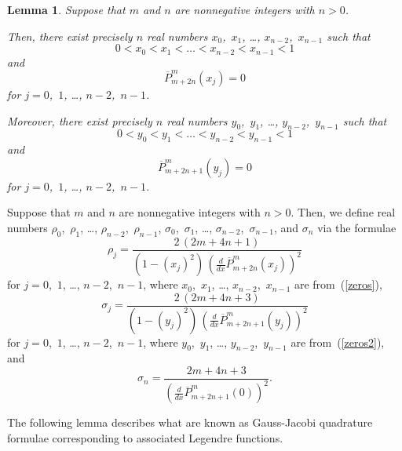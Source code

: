 \documentclass[final,3p,times]{elsarticle}
\newtheorem{lemma1}[theorem]{Lemma}
\newenvironment{lemma}{\begin{lemma1}}{\end{lemma1}}
\begin{document}
\begin{lemma}
\label{distinct_theorem}
Suppose that $m$ and $n$ are nonnegative integers with $n > 0$.

Then, there exist precisely $n$ real numbers
$x_0$,~$x_1$, \dots, $x_{n-2}$,~$x_{n-1}$ such that
\begin{equation}
\label{distinctness}
0 < x_0 < x_1 < \ldots < x_{n-2} < x_{n-1} < 1
\end{equation}
and
\begin{equation}
\label{zeros}
\overline{P}^m_{m+2n}(x_j) = 0
\end{equation}
for $j = 0$,~$1$, \dots, $n-2$,~$n-1$.

Moreover, there exist precisely $n$ real numbers
$y_0$,~$y_1$, \dots, $y_{n-2}$,~$y_{n-1}$ such that
\begin{equation}
\label{distinctness2}
0 < y_0 < y_1 < \ldots < y_{n-2} < y_{n-1} < 1
\end{equation}
and
\begin{equation}
\label{zeros2}
\overline{P}^m_{m+2n+1}(y_j) = 0
\end{equation}
for $j = 0$,~$1$, \dots, $n-2$,~$n-1$.
\end{lemma}


Suppose that $m$ and $n$ are nonnegative integers with $n > 0$.
Then, we define real numbers
$\rho_0$,~$\rho_1$, \dots, $\rho_{n-2}$,~$\rho_{n-1}$,
$\sigma_0$,~$\sigma_1$, \dots, $\sigma_{n-2}$,~$\sigma_{n-1}$,
and $\sigma_n$ via the formulae
\begin{equation}
\label{weights1}
\rho_j
= \frac{2 \, (2m+4n+1)}
       {\left(1-(x_j)^2\right)
        \, \left( \frac{d}{dx} \overline{P}^m_{m+2n}(x_j) \right)^2}
\end{equation}
for $j = 0$,~$1$, \dots, $n-2$,~$n-1$,
where $x_0$,~$x_1$, \dots, $x_{n-2}$,~$x_{n-1}$ are from~(\ref{zeros}),
\begin{equation}
\label{weights2}
\sigma_j
= \frac{2 \, (2m+4n+3)}
  {\left(1-(y_j)^2\right)
   \, \left( \frac{d}{dx} \overline{P}^m_{m+2n+1}(y_j) \right)^2}
\end{equation}
for $j = 0$,~$1$, \dots, $n-2$,~$n-1$,
where $y_0$,~$y_1$, \dots, $y_{n-2}$,~$y_{n-1}$ are from~(\ref{zeros2}), and
\begin{equation}
\label{weights2_0}
\sigma_n
= \frac{2m+4n+3}{\left( \frac{d}{dx} \overline{P}^m_{m+2n+1}(0) \right)^2}.
\end{equation}

The following lemma describes what are known as Gauss-Jacobi quad\-rature
formulae corresponding to associated Legendre functions.
\end{document}
